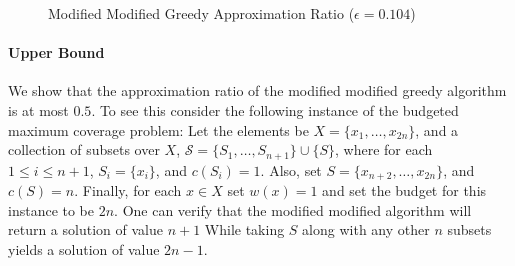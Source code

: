 \begin{figure}
\def\eps{0.104}
\caption{
\label{fig:mmgreedy}
Modified Modified Greedy Approximation Ratio ($\epsilon = 0.104$)
}
\end{figure}

\paragraph{Upper Bound}
We show that the approximation ratio of the modified modified greedy algorithm is at most $0.5$.
To see this consider the following instance of the budgeted maximum coverage problem:
Let the elements be $X = \{x_1, \dots, x_{2n}\}$, 
and a collection of subsets over $X$, $\mathcal{S} = \{S_1, \dots, S_{n + 1}\} \cup \{S\}$,
where for each $1 \leq i \leq n + 1$, $S_i = \{x_i\}$, and $c(S_i) = 1$. 
Also, set $S = \{x_{n + 2}, \dots, x_{2n}\}$, and $c(S) = n$.
Finally, for each $x \in X$ set $w(x) = 1$ and set the budget for this instance to be $2n$.
One can verify that the modified modified algorithm will return a solution of value $n + 1$
While taking $S$ along with any other $n$ subsets yields a solution of value $2n - 1$.  



